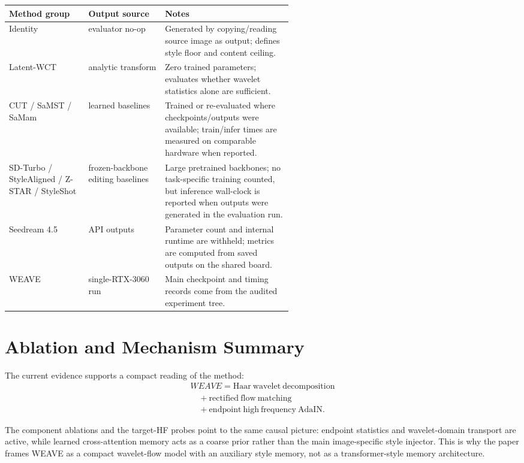 \documentclass[10pt,twocolumn]{article}
\newcommand{\weave}{WEAVE}
\begin{document}
\begin{center}
\footnotesize
\begin{tabularx}{\linewidth}{p{0.28\linewidth}p{0.27\linewidth}X}
\toprule
Method group & Output source & Notes \\
\midrule
Identity & evaluator no-op & Generated by copying/reading source image as output; defines style floor and content ceiling. \\
Latent-WCT & analytic transform & Zero trained parameters; evaluates whether wavelet statistics alone are sufficient. \\
CUT / SaMST / SaMam & learned baselines & Trained or re-evaluated where checkpoints/outputs were available; train/infer times are measured on comparable hardware when reported. \\
SD-Turbo / StyleAligned / Z-STAR / StyleShot & frozen-backbone editing baselines & Large pretrained backbones; no task-specific training counted, but inference wall-clock is reported when outputs were generated in the evaluation run. \\
Seedream 4.5 & API outputs & Parameter count and internal runtime are withheld; metrics are computed from saved outputs on the shared board. \\
WEAVE & single-RTX-3060 run & Main checkpoint and timing records come from the audited experiment tree. \\
\bottomrule
\end{tabularx}
\normalsize
\end{center}

\section{Ablation and Mechanism Summary}

The current evidence supports a compact reading of the method:
\[
  \begin{array}{l}
  \weave{}=\mathrm{Haar\ wavelet\ decomposition}\\
  \quad+\mathrm{rectified\ flow\ matching}\\
  \quad+\mathrm{endpoint\ high\ frequency\ AdaIN}.
  \end{array}
\]

The component ablations and the target-HF probes point to the same causal picture:
endpoint statistics and wavelet-domain transport are active, while learned
cross-attention memory acts as a coarse prior rather than the main image-specific style
injector. This is why the paper frames \weave{} as a compact wavelet-flow model with an
auxiliary style memory, not as a transformer-style memory architecture.
\end{document}
